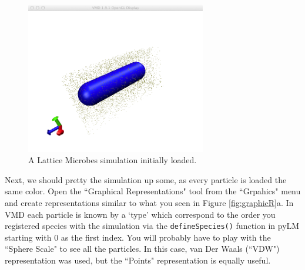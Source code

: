 \begin{figure}[h!]
  \centering
        \includegraphics[width=0.7\textwidth]{Figures/InitiallyLoaded.png}
        \caption{A Lattice Microbes simulation initially loaded.} \label{fig:firstOpen}
\end{figure}

Next, we should pretty the simulation up some, as every particle is loaded the same color.  Open the ``Graphical Representations" tool from the ``Grpahics" menu and create representations similar to what you seen in Figure \ref{fig:graphicR}a.  In VMD each particle is known by a `type' which correspond to the order you registered species with the simulation via the \texttt{defineSpecies()} function in pyLM starting with 0 as the first index.  You will probably have to play with the ``Sphere Scale" to see all the particles. In this case, van Der Waals (``VDW") representation was used, but the ``Points" representation is equally useful.  \\ 

